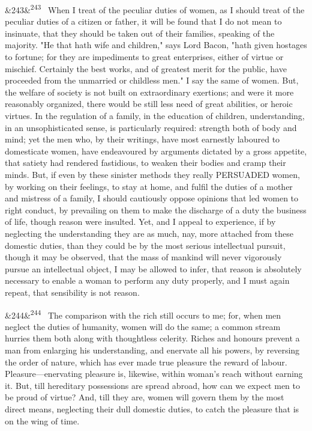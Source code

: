 \documentclass[12pt]{article}
\newcommand{\para}[1][]{\par\noindent\ifx&#1&\else\textsuperscript{\footnotesize #1}~\fi}
\begin{document}
\para[243] When I treat of the peculiar duties of women, as I should treat of the peculiar duties of a citizen or father, it will be found that I do not mean to insinuate, that they should be taken out of their families, speaking of the majority. "He that hath wife and children," says Lord Bacon, "hath given hostages to fortune; for they are impediments to great enterprises, either of virtue or mischief. Certainly the best works, and of greatest merit for the public, have proceeded from the unmarried or childless men." I say the same of women. But, the welfare of society is not built on extraordinary exertions; and were it more reasonably organized, there would be still less need of great abilities, or heroic virtues. In the regulation of a family, in the education of children, understanding, in an unsophisticated sense, is particularly required: strength both of body and mind; yet the men who, by their writings, have most earnestly laboured to domesticate women, have endeavoured by arguments dictated by a gross appetite, that satiety had rendered fastidious, to weaken their bodies and cramp their minds. But, if even by these sinister methods they really PERSUADED women, by working on their feelings, to stay at home, and fulfil the duties of a mother and mistress of a family, I should cautiously oppose opinions that led women to right conduct, by prevailing on them to make the discharge of a duty the business of life, though reason were insulted. Yet, and I appeal to experience, if by neglecting the understanding they are as much, nay, more attached from these domestic duties, than they could be by the most serious intellectual pursuit, though it may be observed, that the mass of mankind will never vigorously pursue an intellectual object, I may be allowed to infer, that reason is absolutely necessary to enable a woman to perform any duty properly, and I must again repeat, that sensibility is not reason.

\para[244] The comparison with the rich still occurs to me; for, when men neglect the duties of humanity, women will do the same; a common stream hurries them both along with thoughtless celerity. Riches and honours prevent a man from enlarging his understanding, and enervate all his powers, by reversing the order of nature, which has ever made true pleasure the reward of labour. Pleasure---enervating pleasure is, likewise, within woman's reach without earning it. But, till hereditary possessions are spread abroad, how can we expect men to be proud of virtue? And, till they are, women will govern them by the most direct means, neglecting their dull domestic duties, to catch the pleasure that is on the wing of time.
\end{document}
